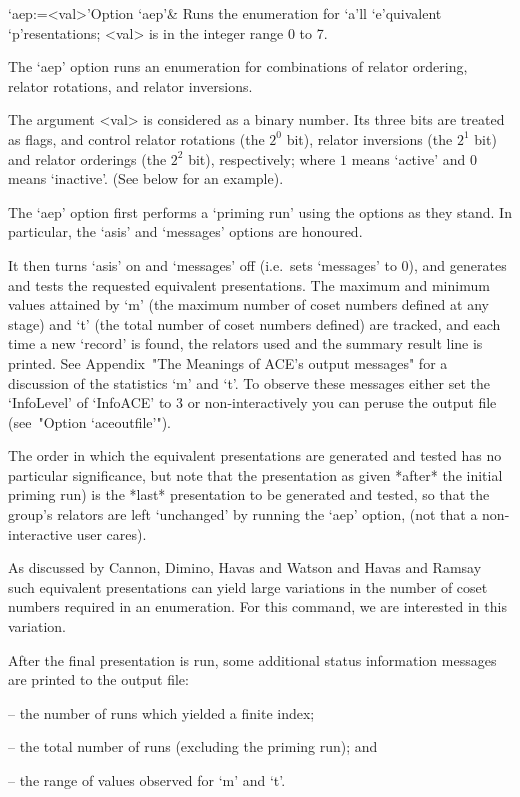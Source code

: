 \beginitems

\>`aep:=<val>'{Option `aep'}&
Runs  the enumeration for `a'll `e'quivalent `p'resentations;
<val> is in the integer range 0 to 7.

The `aep' option runs  an  enumeration  for  combinations  of  relator
ordering, relator rotations, and relator inversions.

The argument <val> is considered as a binary number.  Its  three  bits
are treated as flags, and control relator rotations (the  $2^0$  bit),
relator inversions (the $2^1$ bit) and relator  orderings  (the  $2^2$
bit),  respectively;  where  $1$  means  \lq{}active'  and  $0$  means
\lq{}inactive'. (See below for an example).

The `aep' option first performs a \lq{}priming run' using the  options
as they stand. In particular, the `asis' and  `messages'  options  are
honoured.

It then turns `asis' on and `messages' off  (i.e.~sets  `messages'  to
0), and generates and tests the  requested  equivalent  presentations.
The maximum and minimum values attained by `m' (the maximum number  of
coset numbers defined at any stage) and `t' (the total number of coset
numbers defined) are tracked, and each  time  a  new  \lq{}record'  is
found, the relators used and the summary result line is  printed.  See
Appendix~"The Meanings of ACE's output messages" for a  discussion  of
the statistics `m' and `t'. To observe these messages either  set  the
`InfoLevel' of `InfoACE' to 3 or non-interactively you can peruse  the
{\ACE} output file (see~"Option `aceoutfile'").

The order in which the  equivalent  presentations  are  generated  and
tested has no particular significance, but note that the  presentation
as given *after* the initial priming run) is the  *last*  presentation
to be generated and tested, so that  the  group's  relators  are  left
`unchanged' by running the `aep' option, (not that  a  non-interactive
user cares).

As discussed by Cannon, Dimino, Havas  and  Watson  \cite{CDHW73}  and
Havas and Ramsay \cite{HR99b} such equivalent presentations can  yield
large variations in  the  number  of  coset  numbers  required  in  an
enumeration. For this command, we are interested in this variation.

After  the  final  presentation  is  run,   some   additional   status
information messages are printed to the {\ACE} output file:

\beginlist
\item{--}  the number of runs which yielded a finite index; 
\item{--}  the total number of runs (excluding the priming run); and 
\item{--}  the range of values observed for `m' and `t'.
\endlist

